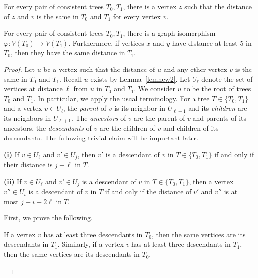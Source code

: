 \documentclass[10pt,a4paper]{amsart}
\begin{document}
\begin{lemma}\label{lemnew2}
    For every pair of consistent trees $T_0, T_1$, there is a vertex $z$ such that the distance of $z$ and $v$ is the same in $T_0$ and $T_1$ for every vertex $v$.
\end{lemma}

\begin{lemma}\label{lem:isom}
    For every pair of consistent trees $T_0, T_1$, there is a graph isomorphism $\varphi \colon V(T_0) \to V(T_1)$. Furthermore, if vertices $x$ and $y$ have distance at least 5 in $T_0$, then they have the same distance in $T_1$.
\end{lemma}

\begin{proof}
Let $u$ be a vertex such that the distance of $u$ and any other vertex $v$ is the same in $T_0$ and $T_1$. Recall $u$ exists by Lemma~\ref{lemnew2}. Let $U_\ell$ denote the set of vertices at distance $\ell$ from $u$ in $T_0$ and $T_1$. We consider $u$ to be the root of trees $T_0$ and $T_1$. In particular, we apply the usual terminology. For a tree $T \in \{T_0, T_1\}$ and a vertex $v\in U_\ell$, the \textit{parent} of $v$ is its neighbor in $U_{\ell-1}$ and its \textit{children} are its neighbors in $U_{\ell+1}$. The \textit{ancestors} of $v$ are the parent of $v$ and parents of its ancestors, the \textit{descendants} of $v$ are the children of $v$ and children of its descendants. The following trivial claim will be important later.

\begin{claim}\label{cla1}
  \textbf{(i)}  If $v\in U_\ell$ and $v'\in U_j$, then $v'$ is a descendant of $v$ in $T \in \{T_0, T_1\}$ if and only if their distance is $j-\ell$ in $T$.

  \textbf{(ii)} If $v\in U_\ell$ and $v'\in U_j$ is a descendant of $v$ in $T \in \{T_0, T_1\}$, then a vertex $v''\in U_i$ is a descendant of $v$ in $T$ if and only if the distance of $v'$ and $v''$ is at most $j+i-2\ell$ in $T$. 
\end{claim}

First, we prove the following.

\begin{claim}\label{cla2}
    If a vertex $v$ has at least three descendants in $T_0$, then the same vertices are its descendants in $T_1$. Similarly, if a vertex $v$ has at least three descendants in $T_1$, then the same vertices are its descendants in $T_0$.
\end{claim}


\end{proof}
\end{document}
